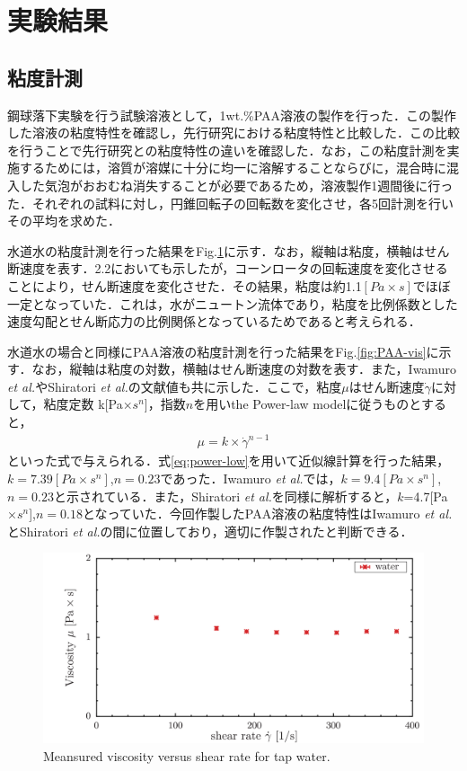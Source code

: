 \section{実験結果}
\subsection{粘度計測}
鋼球落下実験を行う試験溶液として，1wt.\%PAA溶液の製作を行った．この製作した溶液の粘度特性を確認し，先行研究\cite{ref:9}\cite{ref:10}における粘度特性と比較した．この比較を行うことで先行研究との粘度特性の違いを確認した．なお，この粘度計測を実施するためには，溶質が溶媒に十分に均一に溶解することならびに，混合時に混入した気泡がおおむね消失することが必要であるため，溶液製作1週間後に行った．それぞれの試料に対し，円錐回転子の回転数を変化させ，各5回計測を行いその平均を求めた．

水道水の粘度計測を行った結果をFig.\ref{fig:water-vis}に示す．なお，縦軸は粘度，横軸はせん断速度を表す．2.2においても示したが，コーンロータの回転速度を変化させることにより，せん断速度を変化させた．その結果，粘度は約1.1$\left[Pa\times s\right]$でほぼ一定となっていた．これは，水がニュートン流体であり，粘度を比例係数とした速度勾配とせん断応力の比例関係となっているためであると考えられる．

水道水の場合と同様にPAA溶液の粘度計測を行った結果をFig.\ref{fig:PAA-vis}に示す．なお，縦軸は粘度の対数，横軸はせん断速度の対数を表す．また，Iwamuro {\it et al.}\cite{ref:9}やShiratori {\it et al.}\cite{ref:10}の文献値も共に示した．ここで，粘度$\mu$はせん断速度$\dot{\gamma}$に対して，粘度定数 k[Pa$\times s^n$]，指数$n$を用いthe Power-law modelに従うものとすると，
\begin{eqnarray}
    \label{eq:power-low}
    \mu=k\times\dot{\gamma}^{n-1}
\end{eqnarray}
といった式で与えられる\cite{ref:1}．式\ref{eq:power-low}を用いて近似線計算を行った結果，$k=7.39[Pa\times s^n]$,$n=0.23$であった．Iwamuro {\it et al.}\cite{ref:9}では，$k=9.4[Pa\times s^n]$,$n=0.23$と示されている．また，Shiratori {\it et al.}\cite{ref:10}を同様に解析すると，$k$=4.7[Pa$\times s^n$],$n=0.18$となっていた．今回作製したPAA溶液の粘度特性はIwamuro {\it et al.}とShiratori {\it et al.}の間に位置しており，適切に作製されたと判断できる．

\begin{figure}[ht]
    \centering
    \includegraphics[width=12cm,clip]{4-Results/water.png}
    \caption{Meansured viscosity versus shear rate for tap water.}
    \label{fig:water-vis}
\end{figure}

